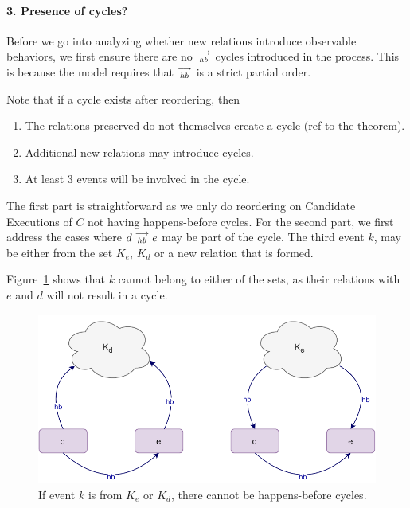 
\paragraph{3. Presence of cycles?}
    Before we go into analyzing whether new relations introduce observable behaviors, we first ensure there are no $\stackrel{\longrightarrow}{_\textit{hb}}$ cycles introduced in the process. 
    This is because the model requires that $\stackrel{\longrightarrow}{_{hb}}$ is a strict partial order. 
    
    Note that if a cycle exists after reordering, then 
    \begin{enumerate}
        \item The relations preserved do not themselves create a cycle (ref to the theorem).
        \item Additional new relations may introduce cycles.
        \item At least 3 events will be involved in the cycle.
    \end{enumerate}

    The first part is straightforward as we only do reordering on Candidate Executions of $C$ not having happens-before cycles. 
    For the second part, we first address the cases where $d\stackrel{\longrightarrow}{_{hb}}e$ may be part of the cycle. 
    The third event $k$, may be either from the set $K_e$, $K_d$ or a new relation that is formed.
    
    Figure~\ref{reord:cycle(a)} shows that $k$ cannot belong to either of the sets, as their relations with $e$ and $d$ will not result in a cycle. 
    \begin{figure}[H]
        \centering
        \includegraphics[scale=0.7]{4.InstructionReordering/4.ValidReorderingCandidate/ProofParts/Part3/part3(b).pdf}
        \caption{If event $k$ is from $K_e$ or $K_d$, there cannot be happens-before cycles.}
        \label{reord:cycle(a)}
    \end{figure}

